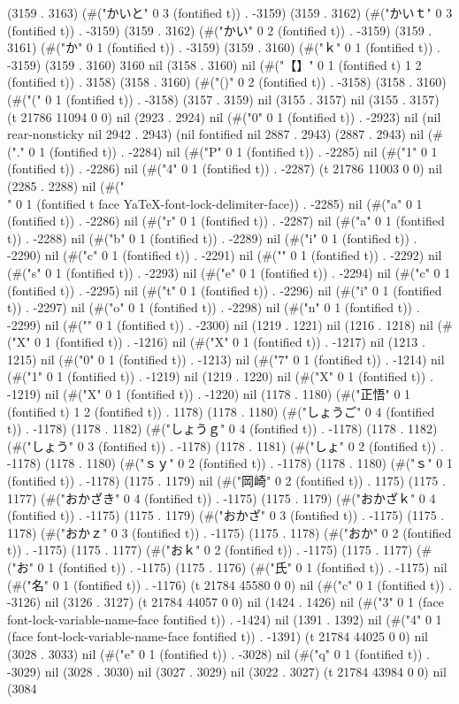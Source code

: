 {(3159 . 3163) (#("かいと" 0 3 (fontified t)) . -3159) (3159 . 3162) (#("かいｔ" 0 3 (fontified t)) . -3159) (3159 . 3162) (#("かい" 0 2 (fontified t)) . -3159) (3159 . 3161) (#("か" 0 1 (fontified t)) . -3159) (3159 . 3160) (#("ｋ" 0 1 (fontified t)) . -3159) (3159 . 3160) 3160 nil (3158 . 3160) nil (#("【】" 0 1 (fontified t) 1 2 (fontified t)) . 3158) (3158 . 3160) (#("()" 0 2 (fontified t)) . -3158) (3158 . 3160) (#("(" 0 1 (fontified t)) . -3158) (3157 . 3159) nil (3155 . 3157) nil (3155 . 3157) (t 21786 11094 0 0) nil (2923 . 2924) nil (#("0" 0 1 (fontified t)) . -2923) nil (nil rear-nonsticky nil 2942 . 2943) (nil fontified nil 2887 . 2943) (2887 . 2943) nil (#("." 0 1 (fontified t)) . -2284) nil (#("P" 0 1 (fontified t)) . -2285) nil (#("1" 0 1 (fontified t)) . -2286) nil (#("4" 0 1 (fontified t)) . -2287) (t 21786 11003 0 0) nil (2285 . 2288) nil (#("\\" 0 1 (fontified t face YaTeX-font-lock-delimiter-face)) . -2285) nil (#("a" 0 1 (fontified t)) . -2286) nil (#("r" 0 1 (fontified t)) . -2287) nil (#("a" 0 1 (fontified t)) . -2288) nil (#("b" 0 1 (fontified t)) . -2289) nil (#("i" 0 1 (fontified t)) . -2290) nil (#("c" 0 1 (fontified t)) . -2291) nil (#("{" 0 1 (fontified t)) . -2292) nil (#("s" 0 1 (fontified t)) . -2293) nil (#("e" 0 1 (fontified t)) . -2294) nil (#("c" 0 1 (fontified t)) . -2295) nil (#("t" 0 1 (fontified t)) . -2296) nil (#("i" 0 1 (fontified t)) . -2297) nil (#("o" 0 1 (fontified t)) . -2298) nil (#("n" 0 1 (fontified t)) . -2299) nil (#("}" 0 1 (fontified t)) . -2300) nil (1219 . 1221) nil (1216 . 1218) nil (#("X" 0 1 (fontified t)) . -1216) nil (#("X" 0 1 (fontified t)) . -1217) nil (1213 . 1215) nil (#("0" 0 1 (fontified t)) . -1213) nil (#("7" 0 1 (fontified t)) . -1214) nil (#("1" 0 1 (fontified t)) . -1219) nil (1219 . 1220) nil (#("X" 0 1 (fontified t)) . -1219) nil (#("X" 0 1 (fontified t)) . -1220) nil (1178 . 1180) (#("正悟" 0 1 (fontified t) 1 2 (fontified t)) . 1178) (1178 . 1180) (#("しょうご" 0 4 (fontified t)) . -1178) (1178 . 1182) (#("しょうｇ" 0 4 (fontified t)) . -1178) (1178 . 1182) (#("しょう" 0 3 (fontified t)) . -1178) (1178 . 1181) (#("しょ" 0 2 (fontified t)) . -1178) (1178 . 1180) (#("ｓｙ" 0 2 (fontified t)) . -1178) (1178 . 1180) (#("ｓ" 0 1 (fontified t)) . -1178) (1175 . 1179) nil (#("岡崎" 0 2 (fontified t)) . 1175) (1175 . 1177) (#("おかざき" 0 4 (fontified t)) . -1175) (1175 . 1179) (#("おかざｋ" 0 4 (fontified t)) . -1175) (1175 . 1179) (#("おかざ" 0 3 (fontified t)) . -1175) (1175 . 1178) (#("おかｚ" 0 3 (fontified t)) . -1175) (1175 . 1178) (#("おか" 0 2 (fontified t)) . -1175) (1175 . 1177) (#("おｋ" 0 2 (fontified t)) . -1175) (1175 . 1177) (#("お" 0 1 (fontified t)) . -1175) (1175 . 1176) (#("氏" 0 1 (fontified t)) . -1175) nil (#("名" 0 1 (fontified t)) . -1176) (t 21784 45580 0 0) nil (#("c" 0 1 (fontified t)) . -3126) nil (3126 . 3127) (t 21784 44057 0 0) nil (1424 . 1426) nil (#("3" 0 1 (face font-lock-variable-name-face fontified t)) . -1424) nil (1391 . 1392) nil (#("4" 0 1 (face font-lock-variable-name-face fontified t)) . -1391) (t 21784 44025 0 0) nil (3028 . 3033) nil (#("e" 0 1 (fontified t)) . -3028) nil (#("q" 0 1 (fontified t)) . -3029) nil (3028 . 3030) nil (3027 . 3029) nil (3022 . 3027) (t 21784 43984 0 0) nil (3084 }
